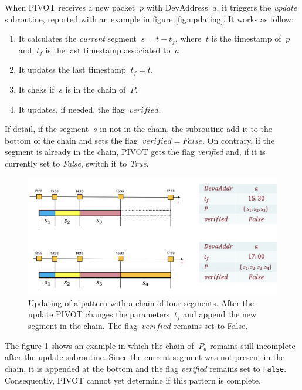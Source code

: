 When PIVOT receives a new packet \(\ p \) with DevAddress \(\ a \), it triggers the \textit{update} subroutine, reported with an example in figure \ref{fig:updating}. It works as follow:
\begin{enumerate}
	\item It calculates the \textit{current} segment \(\ s = t - t_{f} \), where \(\ t \) is the timestamp of \(\ p \) and \(\ t_{f} \) is the last timestamp associated to \(\ a \)
	\item It updates the last timestamp \(\ t_{f} = t \).
	\item It cheks if \(\ s \) is in the chain of \(\ P \). 
	\item It updates, if needed, the flag \(\ verified \).
\end{enumerate}
If detail, if the segment \(\ s \) in not in the chain, the subroutine add it to the bottom of the chain and sets the flag \(\ verified = False \).
On contrary, if the segment is already in the chain, PIVOT gets the flag \textit{verified} and, if it is currently set to \textit{False}, switch it to \textit{True}.

\vspace{3mm}
\begin{figure}[H]
    \centering
    \includegraphics[width=0.7\linewidth]{images/pivot/updating_2.png}
    \caption{Updating of a pattern with a chain of four segments. After the update PIVOT changes the parameters \(\ t_{f}\) and append the new segment in the chain. The flag \(\ verified \) remains set to False.}
    \label{fig:updating_2}
\end{figure}
\vspace{3mm} %

The figure \ref{fig:updating_2} shows an example in which the chain of \(\ P_{a} \) remains still incomplete after the update subroutine. Since the current segment was not present in the chain, it is appended at the bottom and the flag \textit{verified} remains set to \texttt{False}. Consequently, PIVOT cannot yet determine if this pattern is complete.
\vspace{5mm}

